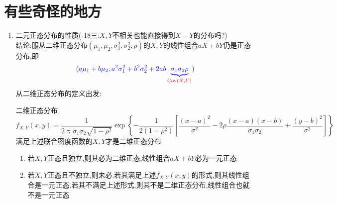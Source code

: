 \documentclass{article}
\begin{document}
\appendix
\section{有些奇怪的地方}
\begin{enumerate}[label=(\arabic*)]
	\item 二元正态分布的性质({-18三:$X,Y$不相关也能直接得到$X-Y$的分布吗?})\\
		  结论:服从二维正态分布$(\mu_1,\mu_2,\sigma_1^2,\sigma_2^2,\rho)$的$X,Y$的线性组合$aX+bY$仍是正态分布,即
		  \[\color{blue}(a\mu_1+b\mu_2,a^2\sigma_1^2+b^2\sigma_2^2+2ab\underbrace{\sigma_1\sigma_2\rho}_{\color{red} \mathrm{Cov}(X,Y)})\]
		  从{\red 二维正态分布}的定义出发:
		  \begin{definition}{二维正态分布}
				\[f_{X,Y}(x,y) = \frac{1}{2\uppi\sigma_1\sigma_2\sqrt{1-\rho^2}}\exp\left\{-\frac{1}{2(1-\rho^2)}\left[\frac{(x-a)^2}{\sigma^2}-2\rho \frac{(x-a)(x-b)}{\sigma_1\sigma_2}+\frac{(y-b)^2}{\sigma^2}\right]\right\}\]
				满足上述联合密度函数的$X,Y$才是二维正态分布
		  \end{definition}
		  \begin{remark}
				\begin{enumerate}[label=(\alph*)]
					\item 若$X,Y$正态且独立,则其必为二维正态,线性组合$aX+bY$必为一元正态
					\item 若$X,Y$正态且不独立,则未必.若其满足上述$f_{X,Y}(x,y)$的形式,则其线性组合是一元正态.若其不满足上述形式,则其不是二维正态分布,线性组合也就不是一元正态
				\end{enumerate}
		  \end{remark}
\end{enumerate}
\end{document}
